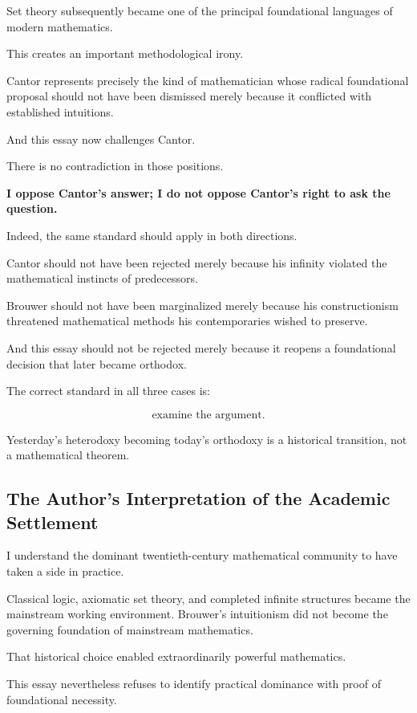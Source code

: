 \documentclass[11pt,a4paper]{article}
\begin{document}
Set theory subsequently became one of the principal foundational
languages of modern mathematics.

This creates an important methodological irony.

Cantor represents precisely the kind of mathematician whose radical
foundational proposal should not have been dismissed merely because it
conflicted with established intuitions.

And this essay now challenges Cantor.

There is no contradiction in those positions.

\begin{center}
\textbf{I oppose Cantor's answer; I do not oppose Cantor's right to ask
the question.}
\end{center}

Indeed, the same standard should apply in both directions.

Cantor should not have been rejected merely because his infinity
violated the mathematical instincts of predecessors.

Brouwer should not have been marginalized merely because his
constructionism threatened mathematical methods his contemporaries
wished to preserve.

And this essay should not be rejected merely because it reopens a
foundational decision that later became orthodox.

The correct standard in all three cases is:

\[
\boxed{
\text{examine the argument}.
}
\]

Yesterday's heterodoxy becoming today's orthodoxy is a historical
transition, not a mathematical theorem.

\subsection{The Author's Interpretation of the Academic Settlement}

I understand the dominant twentieth-century mathematical community to
have taken a side in practice.

Classical logic, axiomatic set theory, and completed infinite structures
became the mainstream working environment. Brouwer's intuitionism did
not become the governing foundation of mainstream mathematics.

That historical choice enabled extraordinarily powerful mathematics.

This essay nevertheless refuses to identify practical dominance with
proof of foundational necessity.
\end{document}
